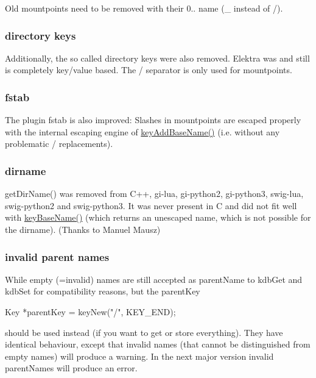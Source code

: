 Old mountpoints need to be removed with their 0.. name ({\ttfamily \+\_\+} instead of {\ttfamily /}).

\subsubsection*{directory keys}

Additionally, the so called directory keys were also removed. Elektra was and still is completely key/value based. The {\ttfamily /} separator is only used for mountpoints.

\subsubsection*{fstab}

The plugin fstab is also improved\+: Slashes in mountpoints are escaped properly with the internal escaping engine of \hyperlink{group__keyname_gaa942091fc4bd5c2699e49ddc50829524}{key\+Add\+Base\+Name()} (i.\+e. without any problematic {\ttfamily /} replacements).

\subsubsection*{dirname}

get\+Dir\+Name() was removed from C++, gi-\/lua, gi-\/python2, gi-\/python3, swig-\/lua, swig-\/python2 and swig-\/python3. It was never present in C and did not fit well with \hyperlink{group__keyname_gaaff35e7ca8af5560c47e662ceb9465f5}{key\+Base\+Name()} (which returns an unescaped name, which is not possible for the dirname). (Thanks to Manuel Mausz)

\subsubsection*{invalid parent names}

While empty (=invalid) names are still accepted as parent\+Name to {\ttfamily kdb\+Get} and {\ttfamily kdb\+Set} for compatibility reasons, but the parent\+Key \begin{DoxyVerb}Key *parentKey = keyNew("/", KEY_END);
\end{DoxyVerb}


should be used instead (if you want to get or store everything). They have identical behaviour, except that invalid names (that cannot be distinguished from empty names) will produce a warning. In the next major version invalid parent\+Names will produce an error.

